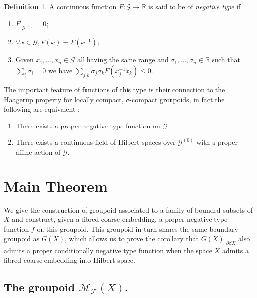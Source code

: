 \documentclass[11pt]{amsart}
\theoremstyle{plain}
\theoremstyle{definition}%
\newtheorem{definition}[theorem]{Definition}%
\theoremstyle{remark}%
\newcommand{\G}{\mathcal{G}}
\begin{document}
\begin{definition}
A continuous function $F: \G \rightarrow \mathbb{R}$ is said to be of \textit{negative type} if 
\begin{enumerate}
\item $F|_{\G^{(0)}}=0$;
\item $\forall x \in \G, F(x)=F(x^{-1})$;
\item Given $x_{1},...,x_{n} \in \G$ all having the same range and $\sigma_{1},...,\sigma_{n} \in \mathbb{R}$ such that $\sum_{i}\sigma_{i}=0$ we have $\sum_{j,k}\sigma_{j}\sigma_{k}F(x_{j}^{-1}x_{k})\leq 0$.
\end{enumerate}
\end{definition}

The important feature of functions of this type is their connection to the Haagerup property for locally compact, $\sigma$-compact groupoids, in fact the following are equivalent \cite{MR1703305}:
\begin{enumerate}
\item There exists a proper negative type function on $\G$
\item There exists a continuous field of Hilbert spaces over $\G^{(0)}$ with a proper affine action of $\G$.
\end{enumerate}

\section{Main Theorem}
We give the construction of groupoid associated to a family of bounded subsets of $X$ and construct, given a fibred coarse embedding, a proper negative type function $f$ on this groupoid. This groupoid in turn shares the same boundary groupoid as $G(X)$, which allows us to prove the corollary that $G(X)|_{\partial\beta X}$ also admits a proper conditionally negative type function when the space $X$ admits a fibred coarse embedding into Hilbert space.

\subsection{The groupoid $\mathcal{M}_{\mathcal{F}}(X)$.}
\end{document}

